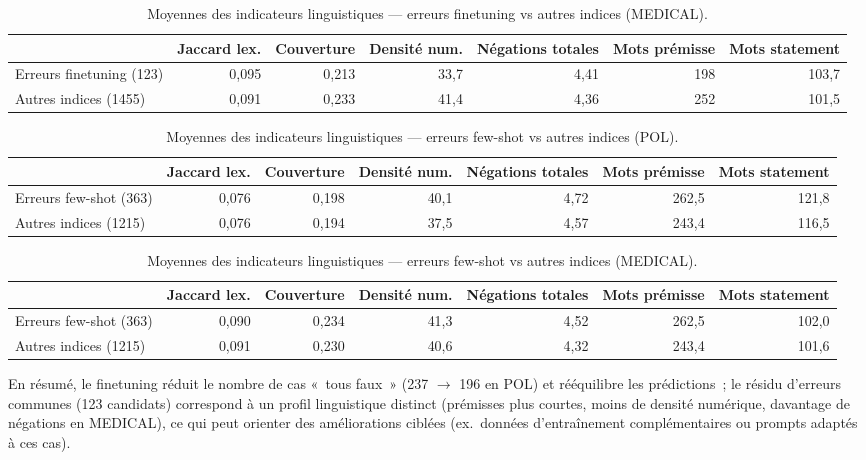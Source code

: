 \documentclass[10pt,twoside]{article}
\begin{document}
\begin{table}[H]
\centering
\caption{Moyennes des indicateurs linguistiques — erreurs finetuning vs autres indices (MEDICAL).}
\label{tab:nli4pr-linguistic-med-ft}
\scriptsize
\begin{tabular}{lrrrrrr}
\toprule
 & Jaccard lex. & Couverture & Densité num. & Négations totales & Mots prémisse & Mots statement \\
\midrule
Erreurs finetuning (123) & 0,095 & 0,213 & 33,7 & 4,41 & 198 & 103,7 \\
Autres indices (1455)    & 0,091 & 0,233 & 41,4 & 4,36 & 252 & 101,5 \\
\bottomrule
\end{tabular}
\end{table}

\begin{table}[H]
\centering
\caption{Moyennes des indicateurs linguistiques — erreurs few-shot vs autres indices (POL).}
\label{tab:nli4pr-linguistic-pol-fs}
\scriptsize
\begin{tabular}{lrrrrrr}
\toprule
 & Jaccard lex. & Couverture & Densité num. & Négations totales & Mots prémisse & Mots statement \\
\midrule
Erreurs few-shot (363) & 0,076 & 0,198 & 40,1 & 4,72 & 262,5 & 121,8 \\
Autres indices (1215)  & 0,076 & 0,194 & 37,5 & 4,57 & 243,4 & 116,5 \\
\bottomrule
\end{tabular}
\end{table}

\begin{table}[H]
\centering
\caption{Moyennes des indicateurs linguistiques — erreurs few-shot vs autres indices (MEDICAL).}
\label{tab:nli4pr-linguistic-med-fs}
\scriptsize
\begin{tabular}{lrrrrrr}
\toprule
 & Jaccard lex. & Couverture & Densité num. & Négations totales & Mots prémisse & Mots statement \\
\midrule
Erreurs few-shot (363) & 0,090 & 0,234 & 41,3 & 4,52 & 262,5 & 102,0 \\
Autres indices (1215)  & 0,091 & 0,230 & 40,6 & 4,32 & 243,4 & 101,6 \\
\bottomrule
\end{tabular}
\end{table}

En résumé, le finetuning réduit le nombre de cas «~tous faux~» (237 $\rightarrow$ 196 en POL) et rééquilibre les prédictions~; le résidu d'erreurs communes (123 candidats) correspond à un profil linguistique distinct (prémisses plus courtes, moins de densité numérique, davantage de négations en MEDICAL), ce qui peut orienter des améliorations ciblées (ex.~données d'entraînement complémentaires ou prompts adaptés à ces cas).
\end{document}

